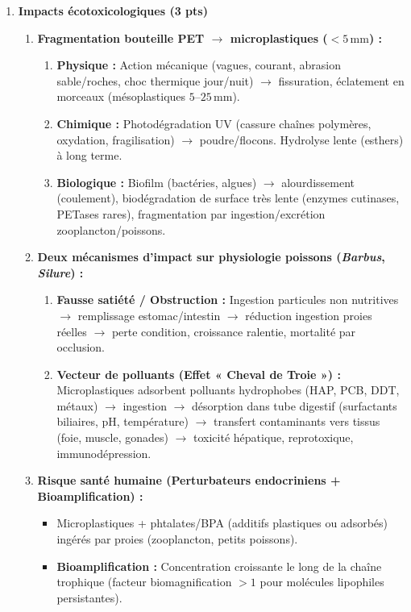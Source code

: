 \documentclass[11pt]{article}
\begin{document}
\begin{corrige}
\begin{enumerate}
    \item \textbf{Impacts écotoxicologiques (3 pts)}
    \begin{enumerate}
        \item \textbf{Fragmentation bouteille PET $\rightarrow$ microplastiques ($<5\,\text{mm}$) :}
        \begin{enumerate}
            \item \textbf{Physique :} Action mécanique (vagues, courant, abrasion sable/roches, choc thermique jour/nuit) $\rightarrow$ fissuration, éclatement en morceaux (mésoplastiques $5\text{--}25\,\text{mm}$).
            \item \textbf{Chimique :} Photodégradation UV (cassure chaînes polymères, oxydation, fragilisation) $\rightarrow$ poudre/flocons. Hydrolyse lente (esthers) à long terme.
            \item \textbf{Biologique :} Biofilm (bactéries, algues) $\rightarrow$ alourdissement (coulement), biodégradation de surface très lente (enzymes cutinases, PETases rares), fragmentation par ingestion/excrétion zooplancton/poissons.
        \end{enumerate}
        \item \textbf{Deux mécanismes d'impact sur physiologie poissons (\emph{Barbus}, \emph{Silure}) :}
        \begin{enumerate}
            \item \textbf{Fausse satiété / Obstruction :} Ingestion particules non nutritives $\rightarrow$ remplissage estomac/intestin $\rightarrow$ réduction ingestion proies réelles $\rightarrow$ perte condition, croissance ralentie, mortalité par occlusion.
            \item \textbf{Vecteur de polluants (Effet « Cheval de Troie ») :} Microplastiques adsorbent polluants hydrophobes (HAP, PCB, DDT, métaux) $\rightarrow$ ingestion $\rightarrow$ désorption dans tube digestif (surfactants biliaires, pH, température) $\rightarrow$ transfert contaminants vers tissus (foie, muscle, gonades) $\rightarrow$ toxicité hépatique, reprotoxique, immunodépression.
        \end{enumerate}
        \item \textbf{Risque santé humaine (Perturbateurs endocriniens + Bioamplification) :}
        \begin{itemize}
            \item Microplastiques + phtalates/BPA (additifs plastiques ou adsorbés) ingérés par proies (zooplancton, petits poissons).
            \item \textbf{Bioamplification :} Concentration croissante le long de la chaîne trophique (facteur biomagnification $>1$ pour molécules lipophiles persistantes).

\end{itemize}
\end{enumerate}
\end{enumerate}
\end{corrige}
\end{document}

